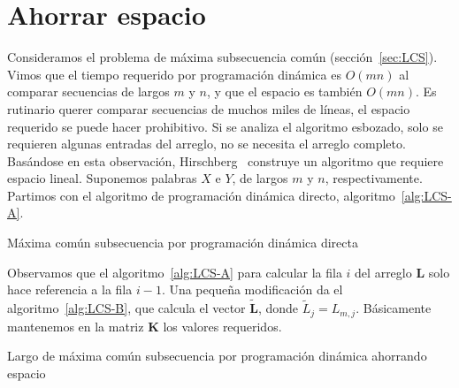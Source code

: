 \section{Ahorrar espacio}
\label{sec:ahorrar-espacio}

  Consideramos el problema de máxima subsecuencia común
  (sección~\ref{sec:LCS}).
  Vimos que el tiempo requerido por programación dinámica
  es \(O(m n)\) al comparar secuencias de largos \(m\) y \(n\),
  y que el espacio es también \(O(m n)\).
  Es rutinario querer comparar secuencias de muchos miles de líneas,
  el espacio requerido se puede hacer prohibitivo.
  Si se analiza el algoritmo esbozado,
  solo se requieren algunas entradas del arreglo,
  no se necesita el arreglo completo.
  Basándose en esta observación,
  Hirschberg~%
    \cite{hirschberg75:_linear_space_algor_comput_maxim_common_subseq}
  construye un algoritmo que requiere espacio lineal.
  Suponemos palabras \(X\) e \(Y\),
  de largos \(m\) y \(n\),
  respectivamente.
  Partimos con el algoritmo de programación dinámica directo,
  algoritmo~\ref{alg:LCS-A}.
  \begin{algorithm}[htbp]
    \DontPrintSemicolon\Indp


    \caption{Máxima común subsecuencia por programación dinámica directa}
    \label{alg:LCS-A}
  \end{algorithm}
  Observamos que el algoritmo~\ref{alg:LCS-A}
  para calcular la fila \(i\) del arreglo \(\mathbf{L}\)
  solo hace referencia a la fila \(i - 1\).
  Una pequeña modificación da el algoritmo~\ref{alg:LCS-B},
  que calcula el vector \(\mathbf{\tilde{L}}\),
  donde \(\tilde{L}_j = L_{m, j}\).
  Básicamente mantenemos en la matriz \(\mathbf{K}\)
  los valores requeridos.
  \begin{algorithm}[htbp]
    \DontPrintSemicolon\Indp


    \caption{Largo de máxima común subsecuencia por programación dinámica
             ahorrando espacio}
    \label{alg:LCS-B}
  \end{algorithm}
